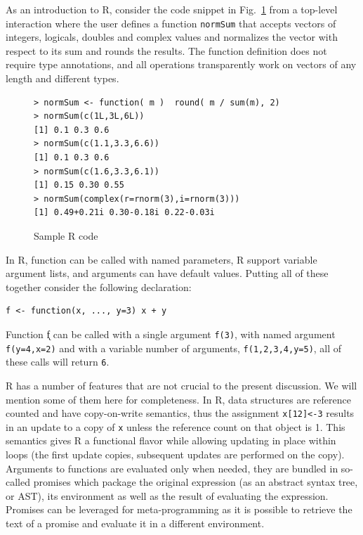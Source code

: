 \documentclass[acmsmall,10pt,review,anonymous]{acmart}\settopmatter{printfolios=true,printccs=false,printacmref=false}
\newcommand{\code}[1]{\lstinline|#1|\xspace}
\begin{document}
As an introduction to R, consider the code snippet in Fig.~\ref{sample} from
a top-level interaction where the user defines a function \code{normSum}
that accepts vectors of integers, logicals, doubles and complex values and
normalizes the vector with respect to its sum and rounds the results. The
function definition does not require type annotations, and all operations
transparently work on vectors of any length and different types.

\begin{figure}[!hb]{\small
\begin{lstlisting}[style=R]
> normSum <- function( m )  round( m / sum(m), 2)
> normSum(c(1L,3L,6L))
[1] 0.1 0.3 0.6
> normSum(c(1.1,3.3,6.6))
[1] 0.1 0.3 0.6
> normSum(c(1.6,3.3,6.1))
[1] 0.15 0.30 0.55
> normSum(complex(r=rnorm(3),i=rnorm(3)))
[1] 0.49+0.21i 0.30-0.18i 0.22-0.03i
\end{lstlisting}}
\caption{Sample R code}\label{sample}
\end{figure}

In R, function can be called with named parameters, R support variable
argument lists, and arguments can have default values. Putting all of these
together consider the following declaration:

\begin{lstlisting}[style=R]
f <- function(x, ..., y=3) x + y
\end{lstlisting}

\noindent
Function \k{f} can be called with a single argument \code{f(3)}, with named
argument \code{f(y=4,x=2)} and with a variable number of arguments,
\code{f(1,2,3,4,y=5)}, all of these calls will return \code{6}.

R has a number of features that are not crucial to the present
discussion. We will mention some of them here for completeness.  In R, data
structures are reference counted and have copy-on-write semantics, thus the
assignment \code{x[12]<-3} results in an update to a copy of \code{x} unless
the reference count on that object is 1.  This semantics gives R a
functional flavor while allowing updating in place within loops (the first
update copies, subsequent updates are performed on the copy). Arguments to
functions are evaluated only when needed, they are bundled in so-called
promises which package the original expression (as an abstract syntax tree, or AST), its environment
as well as the result of evaluating the expression. Promises can be
leveraged for meta-programming as it is possible to retrieve the text of a
promise and evaluate it in a different environment.
\end{document}
